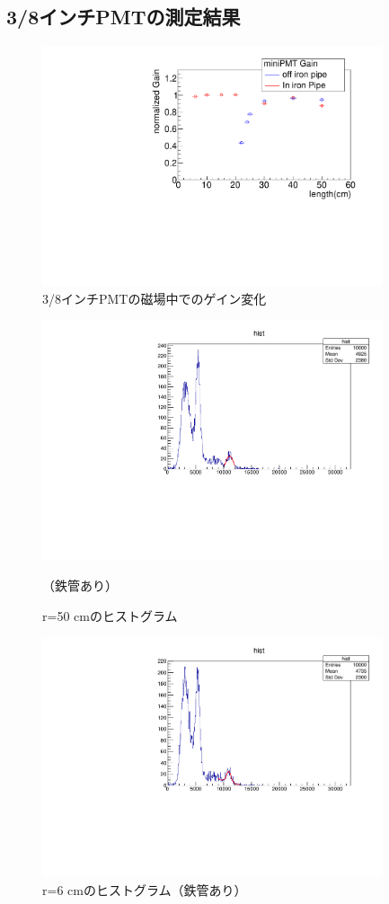\subsection{3/8インチPMTの測定結果}
\begin{figure}[H]
	\centering
		\includegraphics[angle=-90,width=10cm]{fig/iguchi/miniPMTgainG.pdf}
	\caption{3/8インチPMTの磁場中でのゲイン変化}
	\label{miniPMTgainG}
\end{figure}

\begin{figure}[H]
	\centering
		\includegraphics[angle=-90,width=10cm]{fig/iguchi/minicoin22.pdf}
	\caption{r=50 cmのヒストグラム}（鉄管あり）
	\label{histminicoin22}
\end{figure}

\begin{figure}[H]
	\centering
		\includegraphics[angle=-90,width=10cm]{fig/iguchi/minicoin21.pdf}
	\caption{r=6 cmのヒストグラム（鉄管あり）}
	\label{histminicoin21}
\end{figure}

